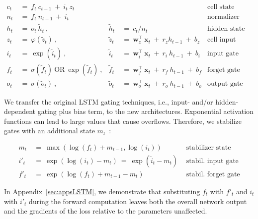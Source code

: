 \begin{align}
\label{eq:slstmforward}
c_t \ &= \  f_t \ c_{t-1} \ + \ i_t \ z_t & & 
 &\text{cell state} \\
n_t \ &= \  f_t \ n_{t-1} \ + \ i_t  & & 
 &\text{normalizer state} \\
h_t \ &= \ o_t \ \tilde{h}_t \ ,
  &\tilde{h}_t \ &= \ c_t / n_t
&\text{hidden state} \\
z_t \ &= \ \varphi \left( \tilde{z}_t \right) \ , 
  &\tilde{z}_t \ &=  \ \mathbf{w}^\top_{z} \ \mathbf{x}_t \ + \
  r_{z}  h_{t-1} \ + \  b_{z}
  &\text{cell input} \\
i_t \ &= \ \!\exp \left( \tilde{i}_t  \right) \ , 
  &\tilde{i}_t \ &= \ \mathbf{w}^\top_{i} \ \mathbf{x}_t \ + \
  r_{i}  \ h_{t-1} \ + \  b_{i}
  &\text{input gate} \\
f_t \ &= \ \sigma \left(  \tilde{f}_t \right) \ \text{OR} \
\!\exp \left(  \tilde{f}_t \right) \ ,
  &\tilde{f}_t \ &= \ \mathbf{w}^\top_{f} \ \mathbf{x}_t  \ + \
  r_{f}  \ h_{t-1} \ + \  b_{f}
  &\text{forget gate} \\
o_t \ &= \ \sigma \left( \tilde{o}_t \right) \ , 
  &\tilde{o}_t  \ &= \ \mathbf{w}^\top_{o} \ \mathbf{x}_t \ + \
  r_{o}  \ h_{t-1} \ + \  b_{o}
  &\text{output gate} 
\end{align}

We transfer the original LSTM gating techniques, i.e., input- and/or hidden-dependent gating plus bias term, to the new architectures. Exponential activation functions can lead to large values that cause overflows. Therefore, we stabilize gates with an additional state \mbox{$m_t$~\citep{Milakov:18arxiv}}:

\begin{align}
\label{eq:slstmstabil}
m_t \ &= \ \max \left( \log ( f_t ) + m_{t-1} , \log ( i_t ) \right) &\text{stabilizer state} \\
i'_t \ &= \ \!\exp \left( \log \left ( i_t \right) - m_t \right) \ = \ \!\exp \left( \tilde{i}_t - m_t \right) \ \, 
  &\text{stabil. input gate} \\
f'_t \ &= \ \!\exp \left( \log \left( f_t \right) + m_{t-1} - m_t \right) \ \, 
  &\text{stabil. forget gate}
\end{align}

In Appendix~\ref{sec:appsLSTM}, we demonstrate that substituting $f_t$ with $f'_t$ and $i_t$ with $i'_t$ during the forward computation leaves both the overall network output and the gradients of the loss relative to the parameters unaffected.

